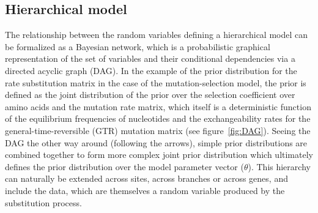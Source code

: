 \subsection{Hierarchical model}
\label{subsec:intro-hierarchical-models}
The relationship between the random variables defining a hierarchical model can be formalized as a Bayesian network, which is a probabilistic graphical representation of the set of variables and their conditional dependencies via a directed acyclic graph (DAG).
In the example of the \gls{prior} distribution for the rate \gls{substitution} matrix in the case of the mutation-selection model, the \gls{prior} is defined as the joint distribution of the \gls{prior} over the selection coefficient over amino acids and the mutation rate matrix, which itself is a deterministic function of the equilibrium frequencies of nucleotides and the exchangeability rates for the general-time-reversible (\acrshort{GTR}) mutation matrix (see figure~\ref{fig:DAG}).
Seeing the DAG the other way around (following the arrows), simple \gls{prior} distributions are combined together to form more complex joint \gls{prior} distribution which ultimately defines the \gls{prior} distribution over the model parameter vector ($\theta$).
This hierarchy can naturally be extended across sites, across branches or across genes, and include the data, which are themselves a random variable produced by the \gls{substitution} process.
